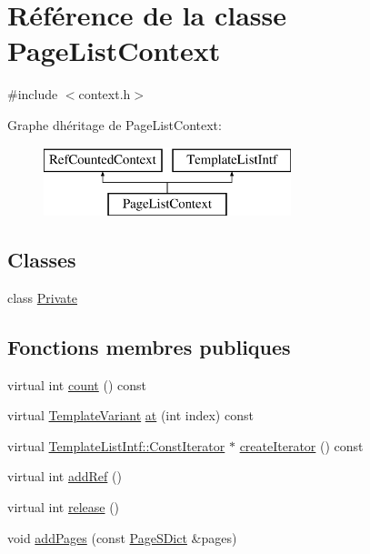 \hypertarget{class_page_list_context}{}\section{Référence de la classe Page\+List\+Context}
\label{class_page_list_context}


{\ttfamily \#include $<$context.\+h$>$}

Graphe d\textquotesingle{}héritage de Page\+List\+Context\+:\begin{figure}[H]
\begin{center}
\leavevmode
\includegraphics[height=2.000000cm]{class_page_list_context}
\end{center}
\end{figure}
\subsection*{Classes}
\begin{DoxyCompactItemize}
\item 
class \hyperlink{class_page_list_context_1_1_private}{Private}
\end{DoxyCompactItemize}
\subsection*{Fonctions membres publiques}
\begin{DoxyCompactItemize}
\item 
virtual int \hyperlink{class_page_list_context_a7b86dbb045ddba0320b5eefe0079e9f3}{count} () const 
\item 
virtual \hyperlink{class_template_variant}{Template\+Variant} \hyperlink{class_page_list_context_a1f08bf2de702a0c0d6c0860493ef15e4}{at} (int index) const 
\item 
virtual \hyperlink{class_template_list_intf_1_1_const_iterator}{Template\+List\+Intf\+::\+Const\+Iterator} $\ast$ \hyperlink{class_page_list_context_abb8ea3644a73bfc85b13720f5fbdde4e}{create\+Iterator} () const 
\item 
virtual int \hyperlink{class_page_list_context_afd248c2c11a415e6e62150580d3ec366}{add\+Ref} ()
\item 
virtual int \hyperlink{class_page_list_context_aec001e0a201e3d1c168a67c80ffc8f06}{release} ()
\item 
void \hyperlink{class_page_list_context_a591d4a2e5eb5827755d0d944482d51b8}{add\+Pages} (const \hyperlink{class_page_s_dict}{Page\+S\+Dict} \&pages)
\end{DoxyCompactItemize}
